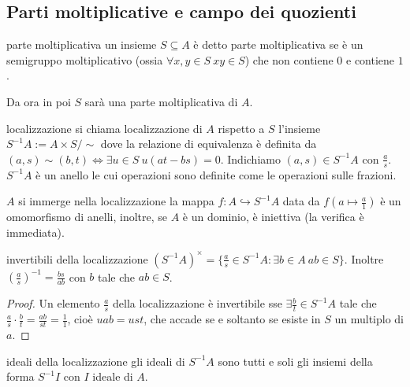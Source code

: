 \subsection{Parti moltiplicative e campo dei quozienti}
\begin{definition}{parte moltiplicativa}
    un insieme $S \subseteq A$ è detto parte moltiplicativa se è un semigruppo moltiplicativo (ossia $\forall x,y\in S \ xy \in S$) che non contiene $0$ e contiene $1$.
    
    Da ora in poi $S$ sarà una parte moltiplicativa di $A$.
\end{definition}
\begin{definition}{localizzazione}
    si chiama localizzazione di $A$ rispetto a $S$ l'insieme $S^{-1}A := A \times S / \sim$ dove la relazione di equivalenza è definita da $(a, s) \sim (b, t) \iff \exists u \in S \ u(at - bs) = 0$. Indichiamo $(a, s) \in S^{-1}A$ con $\frac{a}{s}$. $S^{-1}A$ è un anello le cui operazioni sono definite come le operazioni sulle frazioni.
\end{definition}
\begin{proposition}{$A$ si immerge nella localizzazione}
    la mappa $f: A \hookrightarrow S^{-1}A$ data da $f(a \mapsto \frac{a}{1})$ è un omomorfismo di anelli, inoltre, se $A$ è un dominio, è iniettiva (la verifica è immediata).
\end{proposition}
\begin{proposition}{invertibili della localizzazione}
    $(S^{-1}A)^\times = \{ \frac{a}{s} \in S^{-1}A : \exists b \in A \ ab \in S \}$. Inoltre $\left(\frac{a}{s}\right)^{-1} = \frac{bs}{ab}$ con $b$ tale che $ab \in S$.
\end{proposition}
\begin{proof}
    Un elemento $\frac{a}{s}$ della localizzazione è invertibile sse $\exists \frac{b}{t} \in S^{-1}A$ tale che $\frac{a}{s} \cdot \frac{b}{t} = \frac{ab}{st} = \frac{1}{1}$, cioè $uab = ust$, che accade se e soltanto se esiste in $S$ un multiplo di $a$.
\end{proof}
\begin{theorem}{ideali della localizzazione}
    gli ideali di $S^{-1}A$ sono tutti e soli gli insiemi della forma $S^{-1}I$ con $I$ ideale di $A$.
\end{theorem}
